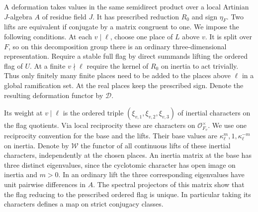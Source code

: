 \documentclass[a4paper,11pt]{article}
\theoremstyle{definition}
\theoremstyle{remark}
\numberwithin{equation}{section}
\begin{document}
A deformation takes values in the same semidirect product over a
local Artinian \(J\)-algebra \(A\) of residue field \(J\). It
has prescribed reduction \(R_0\) and sign \(\eta_F\). Two lifts
are equivalent if conjugate by a matrix congruent to one. We impose the following
conditions. At each \(v\mid\ell\), choose one place of \(L\)
above \(v\). It is split over \(F\), so on this decomposition
group there is an ordinary three-dimensional representation.
Require a stable full flag by direct summands lifting the
ordered flag of \(U\). At a finite \(v\nmid\ell\) require the
kernel of \(R_0\) on inertia to act trivially. Thus only
finitely many finite places need to be added to the places above
\(\ell\) in a global ramification set. At the real places keep
the prescribed sign. Denote the resulting deformation functor
by \(\mathcal D\).

Its weight at \(v\mid\ell\) is the ordered triple
\((\xi_{v,1},\xi_{v,2},\xi_{v,3})\) of inertial characters on the
flag quotients. Via local reciprocity these are characters on
\(\mathcal O_{F_v}^{\times}\). We use one reciprocity convention
for the base and the lifts. Their base values are
\(\kappa_\ell^m,1,\kappa_\ell^{-m}\) on inertia. Denote by
\(\mathcal W\) the functor of all continuous lifts of these
inertial characters, independently at the chosen places.
An inertia matrix at the base has three distinct eigenvalues,
since the cyclotomic character has open image on inertia and
\(m>0\). In an ordinary lift the three corresponding eigenvalues
have unit pairwise differences in \(A\). The spectral projectors
of this matrix show that the flag reducing to the prescribed
ordered flag is unique. In particular taking its characters
defines a map on strict conjugacy classes.
\end{document}
